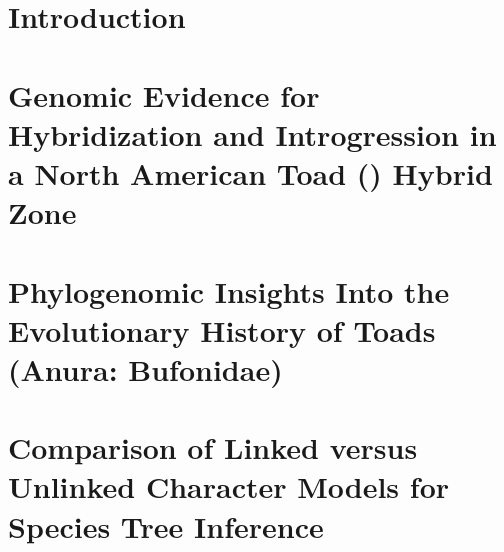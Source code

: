 \documentclass[letterpaper,12pt]{report}
\begin{document}
\thispagestyle{empty}







\renewcommand*\contentsname{Table of Contents}
\tableofcontents

\listoftables
{}

\listoffigures
{}

\chapter{Introduction}

\printbibliography[heading=subbibintoc]

\chapter{Genomic Evidence for Hybridization and Introgression in a North American Toad (\anaxyrus) Hybrid Zone}
% 

% 
\printbibliography[heading=subbibintoc]




\chapter{Phylogenomic Insights Into the Evolutionary History of \anaxyrus Toads (Anura: Bufonidae)}
% 

% 
\printbibliography[heading=subbibintoc]



\chapter{Comparison of Linked versus Unlinked Character Models for Species Tree Inference}

% 
\printbibliography[heading=subbibintoc]







\end{document}
